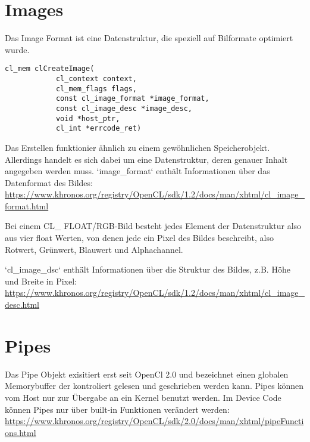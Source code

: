 		\section{Images}
		Das Image Format ist eine Datenstruktur, die speziell auf Bilformate optimiert wurde.
		\begin{lstlisting}[caption=~OpenCL Images]
		cl_mem clCreateImage(
			cl_context context, 
			cl_mem_flags flags,
			const cl_image_format *image_format,
			const cl_image_desc *image_desc,
			void *host_ptr,
			cl_int *errcode_ret)
		\end{lstlisting}	
			
		Das Erstellen funktionier ähnlich zu einem gewöhnlichen Speicherobjekt. Allerdings handelt es sich dabei um eine Datenstruktur, deren genauer Inhalt angegeben werden muss. \li`image_format` enthält Informationen über das Datenformat des Bildes: \url{https://www.khronos.org/registry/OpenCL/sdk/1.2/docs/man/xhtml/cl_image_format.html}
		
		Bei einem CL\_ FLOAT/RGB-Bild besteht jedes Element der Datenstruktur also aus vier float Werten, von denen jede ein Pixel des Bildes beschreibt, also Rotwert, Grünwert, Blauwert und Alphachannel.
		
		\li`cl_image_dsc` enthält Informationen über die Struktur des Bildes, z.B. Höhe und Breite in Pixel: \href{https://www.khronos.org/registry/OpenCL/sdk/1.2/docs/man/xhtml/cl_image_desc.html}{\small https://www.khronos.org/registry/OpenCL/sdk/1.2/docs/man/xhtml/cl{\_}image{\_}desc.html}
		
		\section{Pipes}
		Das Pipe Objekt exisitiert erst seit OpenCl 2.0 und bezeichnet einen globalen Memorybuffer der kontroliert gelesen und geschrieben werden kann. Pipes können vom Host nur zur Übergabe an ein \Gls{Kernel} benutzt werden. Im Device Code können Pipes nur über built-in Funktionen verändert werden: \url{https://www.khronos.org/registry/OpenCL/sdk/2.0/docs/man/xhtml/pipeFunctions.html}
		
